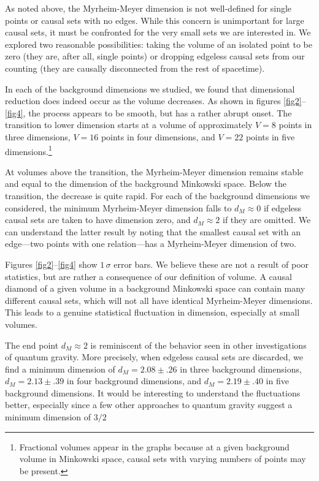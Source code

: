 \documentclass[12pt]{article}
\makeatletter
\def\section{\@startsection{section}{1}{\z@}{3.5ex plus 1ex minus
   .2ex}{2.3ex plus .2ex}{\large\bf}}
\makeatother
\begin{document}
As noted above, the Myrheim-Meyer dimension is not well-defined for single points or
causal sets with no edges.  While this concern is unimportant for large causal sets, it
must be confronted for the very small sets  we are interested in.  We explored
two reasonable possibilities: taking the volume of an isolated point to be zero (they are,
after all, single points) or dropping edgeless causal sets from our counting (they
are causally disconnected from the rest of spacetime).

\section{Results}

In each of the background dimensions we studied, we found that dimensional reduction
does indeed occur as the volume decreases.   As shown in figures \ref{fig2}--\ref{fig4},
the process appears to be smooth, but has a rather abrupt onset.  The
transition to lower dimension starts at a volume of approximately $V=8$ points in
three dimensions, $V=16$ points in four dimensions, and $V=22$ points in five
dimensions.\footnote{Fractional volumes appear in the graphs because at a given
background volume in Minkowski space, causal sets with varying numbers of points
may be present.}

At volumes above the transition, the Myrheim-Meyer dimension remains stable and
equal to the dimension of the background Minkowski space.  Below the transition,
the decrease is quite rapid.  For each of the background dimensions we considered,
the minimum Myrheim-Meyer dimension falls to $d_M\approx 0$ if edgeless causal
sets are taken to have dimension zero, and $d_M\approx 2$ if they are omitted.
We can understand the latter result by noting that the smallest causal set with an
edge---two points with one relation---has a Myrheim-Meyer dimension of two.

Figures \ref{fig2}--\ref{fig4} show $1\, \sigma$ error bars.  We believe these are not
a result of poor statistics, but are rather a consequence of our definition of
volume.  A causal diamond of a given volume in a background Minkowski space can
contain many different causal sets, which will not all have identical Myrheim-Meyer
dimensions.  This leads to a genuine statistical fluctuation in dimension, especially
at small volumes.

The end point $d_M\approx 2$ is reminiscent of the behavior seen in other
investigations of quantum gravity.  More precisely, when edgeless causal
sets are discarded, we find a minimum dimension of $d_M = 2.08 \pm .26$ in three
background dimensions, $d_M = 2.13 \pm .39$ in four background dimensions, and
$d_M = 2.19 \pm .40$ in five background  dimensions.  It would be interesting to
understand the fluctuations better, especially since a few other approaches to
quantum gravity suggest a minimum dimension of $3/2$
\end{document}
